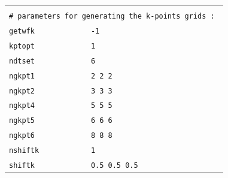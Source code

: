 \documentclass[11pt,a4paper]{article}
\begin{document}
\begin{center}
\begin{tabular}{lll}
&&\\
\multicolumn{3}{l}{\texttt{\# parameters for generating the k-points grids : }}\\
\texttt{getwfk} & \texttt{-1}&\\
\texttt{kptopt} & \texttt{1} &\\
\texttt{ndtset} & \texttt{6}&\\
\texttt{ngkpt1} & \texttt{2 2 2}&\\
\texttt{ngkpt2} & \texttt{3 3 3}&\\
\texttt{ngkpt4} & \texttt{5 5 5}&\\
\texttt{ngkpt5} & \texttt{6 6 6}&\\
\texttt{ngkpt6} & \texttt{8 8 8}&\\
\texttt{nshiftk} &\texttt{1}&\\
\texttt{shiftk} &\texttt{0.5 0.5 0.5}&
\end{tabular}
\end{center} 
\newpage
\end{document}

